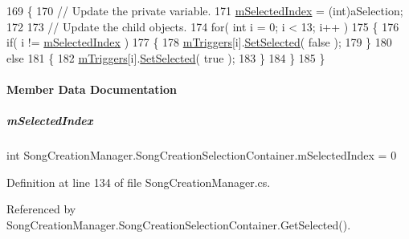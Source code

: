 \begin{DoxyCode}
169         \{
170             \textcolor{comment}{// Update the private variable.}
171             \hyperlink{group___s_c_m_nest_class_a1684b25b3eb0e87f189996de22bf9792}{mSelectedIndex} = (int)aSelection;
172 
173             \textcolor{comment}{// Update the child objects.}
174             \textcolor{keywordflow}{for}( \textcolor{keywordtype}{int} i = 0; i < 13; i++ )
175             \{
176                 \textcolor{keywordflow}{if}( i != \hyperlink{group___s_c_m_nest_class_a1684b25b3eb0e87f189996de22bf9792}{mSelectedIndex} )
177                 \{
178                     \hyperlink{group___s_c_m_nest_class_aeda161975a8a683281b9388b2c905ae8}{mTriggers}[i].\hyperlink{group___s_c_m_nest_class_a0d65cd109a370034f580d63e823725b9}{SetSelected}( \textcolor{keyword}{false} );
179                 \}
180                 \textcolor{keywordflow}{else}
181                 \{
182                     \hyperlink{group___s_c_m_nest_class_aeda161975a8a683281b9388b2c905ae8}{mTriggers}[i].\hyperlink{group___s_c_m_nest_class_a0d65cd109a370034f580d63e823725b9}{SetSelected}( \textcolor{keyword}{true} );
183                 \}
184             \}
185         \}
\end{DoxyCode}


\paragraph{Member Data Documentation}
\mbox{\label{group___s_c_m_nest_class_a1684b25b3eb0e87f189996de22bf9792}} 
\subparagraph{\texorpdfstring{m\+Selected\+Index}{mSelectedIndex}}
{\footnotesize\ttfamily int Song\+Creation\+Manager.\+Song\+Creation\+Selection\+Container.\+m\+Selected\+Index = 0\hspace{0.3cm}{\ttfamily [private]}}



Definition at line 134 of file Song\+Creation\+Manager.\+cs.



Referenced by Song\+Creation\+Manager.\+Song\+Creation\+Selection\+Container.\+Get\+Selected().

